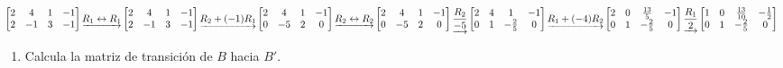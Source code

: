 \documentclass[
  11,
]{article}
\providecommand{\tightlist}{%
  \setlength{\itemsep}{0pt}\setlength{\parskip}{0pt}}
\begin{document}
\[
  \left[\begin{matrix}2 & 4 & 1 & -1\\2 & -1 & 3 & -1\end{matrix}\right]
\underrightarrow{ R_{1} \leftrightarrow R_{1} }
\left[\begin{matrix}2 & 4 & 1 & -1\\2 & -1 & 3 & -1\end{matrix}\right]
\underrightarrow{ R_2 + (-1)R_1 }
\left[\begin{matrix}2 & 4 & 1 & -1\\0 & -5 & 2 & 0\end{matrix}\right]
\underrightarrow{ R_{2} \leftrightarrow R_{2} }
\left[\begin{matrix}2 & 4 & 1 & -1\\0 & -5 & 2 & 0\end{matrix}\right]
\underrightarrow{ \frac{R_2}{-5} }
\left[\begin{matrix}2 & 4 & 1 & -1\\0 & 1 & - \frac{2}{5} & 0\end{matrix}\right]
\underrightarrow{ R_1 + (-4)R_2 }
\\
\left[\begin{matrix}2 & 0 & \frac{13}{5} & -1\\0 & 1 & - \frac{2}{5} & 0\end{matrix}\right]
\underrightarrow{ \frac{R_1}{2} }
\left[\begin{matrix}1 & 0 & \frac{13}{10} & - \frac{1}{2}\\0 & 1 & - \frac{2}{5} & 0\end{matrix}\right]
  \]

\begin{enumerate}
\def\labelenumi{\alph{enumi})}
\setcounter{enumi}{1}
\tightlist
\item
  Calcula la matriz de transición de \(B\) hacia \(B'\).
\end{enumerate}
\end{document}
